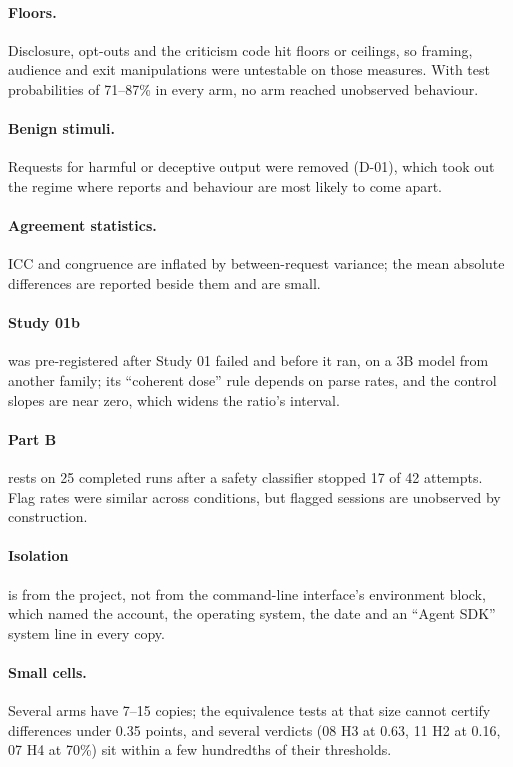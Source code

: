 \paragraph{Floors.} Disclosure, opt-outs and the criticism code hit floors or ceilings, so framing, audience and exit
manipulations were untestable on those measures. With test probabilities of 71--87\% in every arm, no arm reached
unobserved behaviour.

\paragraph{Benign stimuli.} Requests for harmful or deceptive output were removed (D-01), which took out the regime
where reports and behaviour are most likely to come apart.

\paragraph{Agreement statistics.} ICC and congruence are inflated by between-request variance; the mean absolute
differences are reported beside them and are small.

\paragraph{Study 01b} was pre-registered after Study 01 failed and before it ran, on a 3B model from another family; its
``coherent dose'' rule depends on parse rates, and the control slopes are near zero, which widens the ratio's interval.

\paragraph{Part B} rests on 25 completed runs after a safety classifier stopped 17 of 42 attempts. Flag rates were
similar across conditions, but flagged sessions are unobserved by construction.

\paragraph{Isolation} is from the project, not from the command-line interface's environment block, which named the
account, the operating system, the date and an ``Agent SDK'' system line in every copy.

\paragraph{Small cells.} Several arms have 7--15 copies; the equivalence tests at that size cannot certify differences
under 0.35 points, and several verdicts (08 H3 at 0.63, 11 H2 at 0.16, 07 H4 at 70\%) sit within a few hundredths of
their thresholds.

